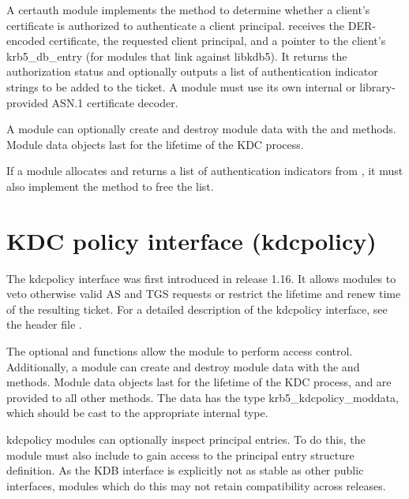 \documentclass[letterpaper,10pt,english]{sphinxmanual}
\begin{document}
A certauth module implements the  method to determine
whether a client’s certificate is authorized to authenticate a client
principal.   receives the DER-encoded certificate, the
requested client principal, and a pointer to the client’s
krb5\_db\_entry (for modules that link against libkdb5).  It returns the
authorization status and optionally outputs a list of authentication
indicator strings to be added to the ticket.  A module must use its
own internal or library-provided ASN.1 certificate decoder.

A module can optionally create and destroy module data with the
 and  methods.  Module data objects last for the
lifetime of the KDC process.

If a module allocates and returns a list of authentication indicators
from , it must also implement the  method
to free the list.


\section{KDC policy interface (kdcpolicy)}
\label{\detokenize{plugindev/kdcpolicy:kdcpolicy-plugin}}\label{\detokenize{plugindev/kdcpolicy::doc}}\label{\detokenize{plugindev/kdcpolicy:kdc-policy-interface-kdcpolicy}}
The kdcpolicy interface was first introduced in release 1.16.  It
allows modules to veto otherwise valid AS and TGS requests or restrict
the lifetime and renew time of the resulting ticket.  For a detailed
description of the kdcpolicy interface, see the header file
.

The optional  and  functions allow the module
to perform access control.  Additionally, a module can create and
destroy module data with the  and  methods.  Module
data objects last for the lifetime of the KDC process, and are
provided to all other methods.  The data has the type
krb5\_kdcpolicy\_moddata, which should be cast to the appropriate
internal type.

kdcpolicy modules can optionally inspect principal entries.  To do
this, the module must also include  to gain access to the
principal entry structure definition.  As the KDB interface is
explicitly not as stable as other public interfaces, modules which do
this may not retain compatibility across releases.



\renewcommand{\indexname}{Index}
\printindex
\end{document}
